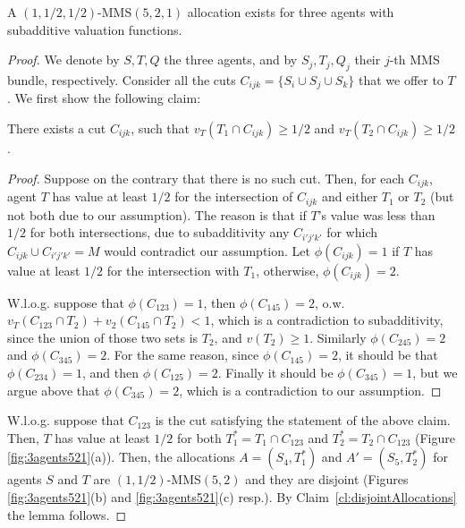 \begin{lemma} 
\label{lem:(5,2,1)}
A $(1,1/2,1/2)$-MMS$(5,2,1)$ allocation exists for three agents with subadditive valuation functions.
\end{lemma}
\begin{proof}
    We denote by $S,T,Q$ the three agents, and by $S_j,T_j,Q_j$ their $j$-th MMS bundle, respectively. 
    Consider all the cuts $C_{ijk}=\{S_i \cup S_j \cup S_k\}$ that we offer to $T$. We first show the following claim:
    \begin{claim}
        There exists a cut $C_{ijk}$, such that $v_T(T_1\cap C_{ijk})\geq 1/2$ and $v_T(T_2\cap C_{ijk})\geq 1/2$. 
    \end{claim}
    \begin{proof}
        Suppose on the contrary that there is no such cut. Then, for each $C_{ijk}$, agent $T$ has value at least $1/2$ for the intersection of $C_{ijk}$ and either $T_1$ or $T_2$ (but not both due to our assumption). The reason is that if $T$'s value was less than $1/2$ for both intersections, due to subadditivity any $C_{i'j'k'}$ for which $C_{ijk} \cup C_{i'j'k'}=M$ would contradict our assumption. 
        Let $\phi(C_{ijk})=1$ if $T$ has value at least $1/2$ for the intersection with $T_1$, otherwise, $\phi(C_{ijk})=2$.

        W.l.o.g. suppose that  $\phi(C_{123})=1$, then $\phi(C_{145})=2$, o.w. $v_T(C_{123}\cap T_2)+v_2(C_{145}\cap T_2)<1$, which is a contradiction to subadditivity, since the union of those two sets is $T_2$, and $v(T_2)\geq 1$. Similarly $\phi(C_{245})=2$ and $\phi(C_{345})=2$. 
        For the same reason, since $\phi(C_{145})=2$, it should be that $\phi(C_{234})=1$, and then $\phi(C_{125})=2$. Finally it should be $\phi(C_{345})=1$, but we argue above that $\phi(C_{345})=2$, which is a contradiction to our assumption. 
    \end{proof}  


        
    W.l.o.g. suppose that $C_{123}$ is the cut satisfying the statement of the above claim. Then, $T$ has value at least $1/2$ for both $T_1^*=T_1\cap C_{123}$ and $T_2^*=T_2\cap C_{123}$ (Figure \ref{fig:3agents521}(a)). Then, the allocations $A=(S_4,T_1^*)$ and  $A'=(S_5,T_2^*)$ for agents $S$ and $T$ are $(1,1/2)$-MMS$(5,2)$ and they are disjoint (Figures \ref{fig:3agents521}(b) and \ref{fig:3agents521}(c) resp.). By Claim~\ref{cl:disjointAllocations} the lemma follows. 
\end{proof}


